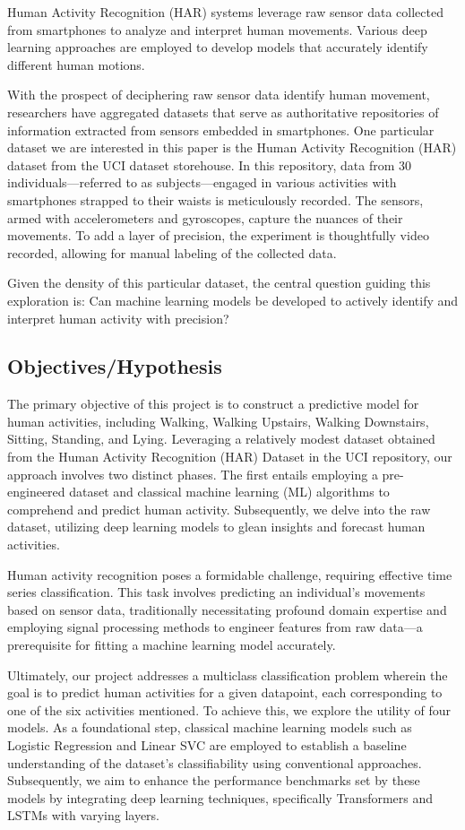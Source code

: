 \documentclass[conference]{IEEEtran}
\begin{document}
Human Activity Recognition (HAR) systems leverage raw sensor data collected from smartphones to analyze and interpret human movements. Various deep learning approaches are employed to develop models that accurately identify different human motions.


With the  prospect of deciphering raw sensor data identify human movement, researchers have aggregated datasets that serve as authoritative repositories of information extracted from sensors embedded in smartphones. One particular dataset we are interested in this paper is the Human Activity Recognition (HAR) dataset from the UCI dataset storehouse. In this repository, data from 30 individuals—referred to as subjects—engaged in various activities with smartphones strapped to their waists is meticulously recorded. The sensors, armed with accelerometers and gyroscopes, capture the nuances of their movements. To add a layer of precision, the experiment is thoughtfully video recorded, allowing for manual labeling of the collected data.

Given the density of this particular dataset, the central question guiding this exploration is: Can machine learning models be developed to actively identify and interpret human activity with precision?

\subsection{Objectives/Hypothesis}
The primary objective of this project is to construct a predictive model for human activities, including Walking, Walking Upstairs, Walking Downstairs, Sitting, Standing, and Lying. Leveraging a relatively modest dataset obtained from the Human Activity Recognition (HAR) Dataset in the UCI repository, our approach involves two distinct phases. The first entails employing a pre-engineered dataset and classical machine learning (ML) algorithms to comprehend and predict human activity. Subsequently, we delve into the raw dataset, utilizing deep learning models to glean insights and forecast human activities.

Human activity recognition poses a formidable challenge, requiring effective time series classification. This task involves predicting an individual's movements based on sensor data, traditionally necessitating profound domain expertise and employing signal processing methods to engineer features from raw data—a prerequisite for fitting a machine learning model accurately.

Ultimately, our project addresses a multiclass classification problem wherein the goal is to predict human activities for a given datapoint, each corresponding to one of the six activities mentioned. To achieve this, we explore the utility of four models. As a foundational step, classical machine learning models such as Logistic Regression and Linear SVC are employed to establish a baseline understanding of the dataset's classifiability using conventional approaches. Subsequently, we aim to enhance the performance benchmarks set by these models by integrating deep learning techniques, specifically Transformers and LSTMs with varying layers.
\end{document}
